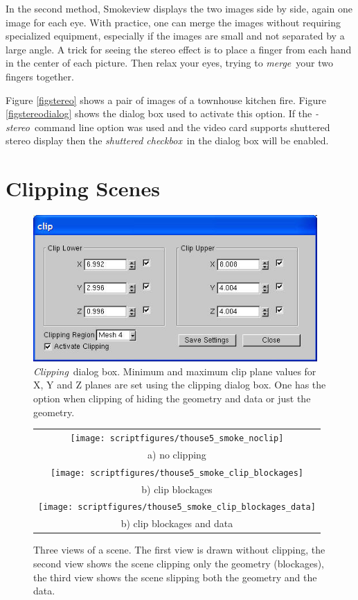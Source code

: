 \documentclass[11pt,twoside]{book}
\newcommand{\figoptions}{hbp}
\begin{document}
In the second method, Smokeview displays the two images side by side, again one image for each eye.  With practice, one can merge the images without requiring specialized equipment, especially if the images are small and not separated by a large angle.
A trick for seeing the stereo effect is to place a finger from each hand in the center of each picture.  Then relax your eyes, trying to {\em merge}\ your two fingers together.

Figure \ref{figstereo} shows
a pair of images of a townhouse kitchen fire.  Figure \ref{figstereodialog} shows the dialog
box used to activate this option.  If the {\em -stereo}\ command line option was used and
the video card supports shuttered stereo display then the {\em shuttered checkbox}\ in the dialog box will be enabled.

\section{Clipping Scenes}


\begin{figure}[\figoptions]
\begin{center}
\includegraphics[width=4.2708333in]{figures/figCLIP}
\end{center}
\caption[{\em Clipping}\ dialog box.]{{\em Clipping}\ dialog box.
Minimum and maximum clip plane values for X, Y and Z planes are set
using the clipping dialog box.  One has the option when clipping of
hiding the geometry and data
or just the geometry.
}
\label{figCLIP}
\end{figure}

\begin{figure}[\figoptions]
\begin{center}
\begin{tabular}{c}
\texttt{[image: scriptfigures/thouse5\_smoke\_noclip]}\\
a) no clipping\\
\texttt{[image: scriptfigures/thouse5\_smoke\_clip\_blockages]}\\
b) clip blockages\\
\texttt{[image: scriptfigures/thouse5\_smoke\_clip\_blockages\_data]}\\
b) clip blockages and data\\
\end{tabular}
\end{center}
\caption[Clipping a scene.]{Three views of a
scene. The first view is drawn without clipping, the second
view shows the scene clipping only the geometry (blockages), the third view
shows the scene slipping both the geometry and the data.}
\label{figCLIPPED}
\end{figure}
\end{document}
